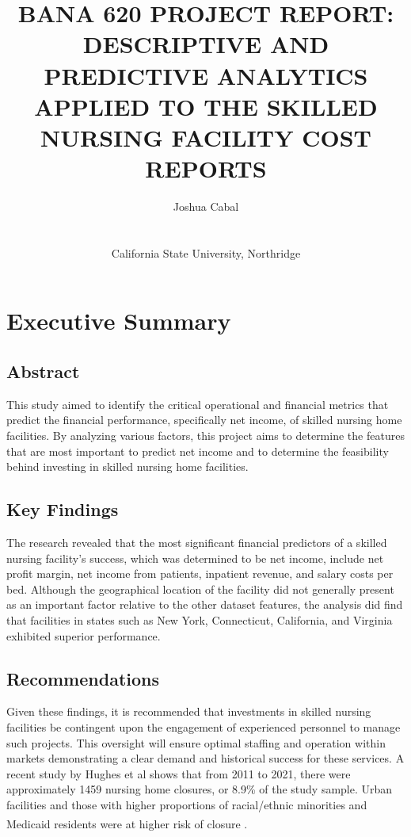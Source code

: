\documentclass{article}
\title{\textbf{BANA 620 PROJECT REPORT: DESCRIPTIVE AND PREDICTIVE ANALYTICS APPLIED TO THE SKILLED NURSING FACILITY COST REPORTS}}
\author{Joshua Cabal \\ \\ \\California State University, Northridge \\}
\theoremstyle{mytheoremstyle}
\theoremstyle{mytheoremstyle}
\theoremstyle{myproblemstyle}
\begin{document}
    \maketitle
    \pagebreak
    \tableofcontents    
    \newpage


\section{Executive Summary}

\subsection{Abstract}

This study aimed to identify the critical operational and financial metrics that predict the financial performance, specifically net income, of skilled nursing home facilities. By analyzing various factors, this project aims to determine the features that are most important to predict net income and to determine the feasibility behind investing in skilled nursing home facilities.

\subsection{Key Findings}

The research revealed that the most significant financial predictors of a skilled nursing facility's success, which was determined to be net income, include net profit margin, net income from patients, inpatient revenue, and salary costs per bed. Although the geographical location of the facility did not generally present as an important factor relative to the other dataset features, the analysis did find that facilities in states such as New York, Connecticut, California, and Virginia exhibited superior performance.

\subsection{Recommendations}

Given these findings, it is recommended that investments in skilled nursing facilities be contingent upon the engagement of experienced personnel to manage such projects. This oversight will ensure optimal staffing and operation within markets demonstrating a clear demand and historical success for these services. A recent study by Hughes et al shows that from 2011 to 2021, there were approximately 1459 nursing home closures, or 8.9\% of the study sample. Urban facilities and those with higher proportions of racial/ethnic minorities and Medicaid residents were at higher risk of closure \textsuperscript{\cite{hughes2023rates}}.
\pagebreak
\end{document}
